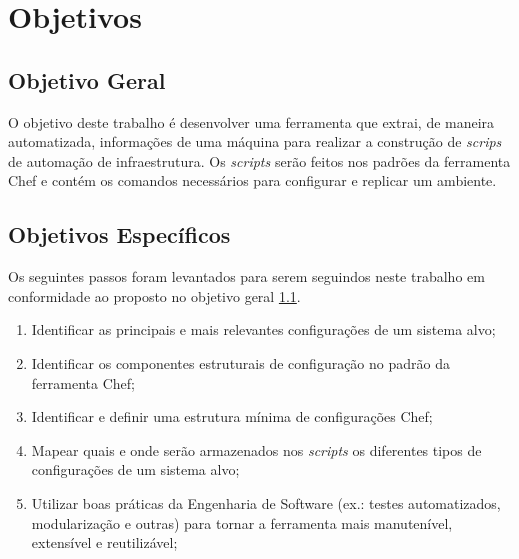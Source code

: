 \section{Objetivos}
\label{sec:obj}

\subsection{Objetivo Geral}
\label{sec:obj-grl}

O objetivo deste trabalho é desenvolver uma ferramenta que extrai,
de maneira automatizada, informações de uma máquina para realizar
a construção de \textit{scrips} de automação de infraestrutura. Os \textit{scripts}
serão feitos nos padrões da ferramenta Chef e contém os comandos
necessários para configurar e replicar um ambiente.

\subsection{Objetivos Específicos}
\label{sec:obj-esp}

Os seguintes passos foram levantados para serem seguindos neste trabalho
em conformidade ao proposto no objetivo geral \ref{sec:obj-grl}.

\begin{enumerate}
  \item Identificar as principais e mais relevantes configurações de um sistema
    alvo;
  \item Identificar os componentes estruturais de configuração no padrão da
    ferramenta Chef;
  \item Identificar e definir uma estrutura mínima de configurações Chef;
  \item Mapear quais e onde serão armazenados nos \textit{scripts} os
    diferentes tipos de configurações de um sistema alvo;
  \item Utilizar boas práticas da Engenharia de Software (ex.: testes
    automatizados, modularização e outras) para tornar a ferramenta mais
    manutenível, extensível e reutilizável;
\end{enumerate}

